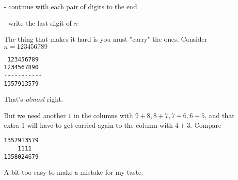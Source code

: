 \documentclass[11pt, oneside]{article}
\begin{document}
- continue with each pair of digits to the end

- write the last digit of $n$

The thing that makes it hard is you must "carry" the ones.  Consider $n=123456789$

\begin{verbatim}
 123456789
1234567890
-----------
1357913579
\end{verbatim}

That's \emph{almost} right.

But we need another $1$ in the columns with $9+8, 8+7, 7+6, 6+5$, and that extra $1$ will have to get carried again to the column with $4+3$.  Compare

\begin{verbatim}
1357913579
    1111
1358024679
\end{verbatim}

A bit too easy to make a mistake for my taste.
\end{document}
